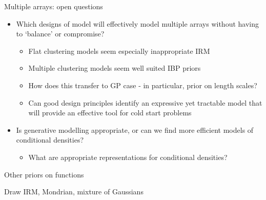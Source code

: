 \begin{frame}{Multiple arrays: open questions}
  \begin{block}{}
    \begin{itemize}
      \item Which designs of model will effectively model multiple arrays without having to `balance' or compromise?
      \begin{itemize}
        \item Flat clustering models seem especially inappropriate \eg IRM
        \item Multiple clustering models seem well suited \eg IBP priors
        \item How does this transfer to GP case - in particular, prior on length scales?
        \item Can good design principles identify an expressive yet tractable model that will provide an effective tool for cold start problems
      \end{itemize}
      \vspace{\baselineskip}
      \item Is generative modelling appropriate, or can we find more efficient models of conditional densities?
      \begin{itemize}
        \item What are appropriate representations for conditional densities?
      \end{itemize}
      \end{itemize}
  \end{block}
\end{frame}

\begin{frame}{Other priors on functions}
  \begin{block}{}
    Draw IRM, Mondrian, mixture of Gaussians
  \end{block}
\end{frame}

